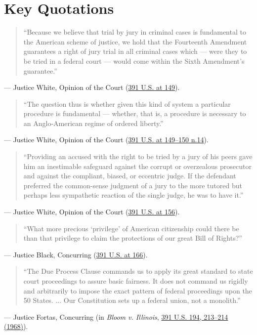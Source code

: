 \documentclass[12pt]{article}
\begin{document}
\section{Key Quotations}

\begin{quote}
``Because we believe that trial by jury in criminal cases is fundamental to the American scheme of justice, we hold that the Fourteenth Amendment guarantees a right of jury trial in all criminal cases which --- were they to be tried in a federal court --- would come within the Sixth Amendment's guarantee.''
\end{quote}
\noindent --- Justice White, Opinion of the Court (\href{https://supreme.justia.com/cases/federal/us/391/145/}{391 U.S. at 149}).

\begin{quote}
``The question thus is whether given this kind of system a particular procedure is fundamental --- whether, that is, a procedure is necessary to an Anglo-American regime of ordered liberty.''
\end{quote}
\noindent --- Justice White, Opinion of the Court (\href{https://supreme.justia.com/cases/federal/us/391/145/}{391 U.S. at 149--150 n.14}).

\begin{quote}
``Providing an accused with the right to be tried by a jury of his peers gave him an inestimable safeguard against the corrupt or overzealous prosecutor and against the compliant, biased, or eccentric judge. If the defendant preferred the common-sense judgment of a jury to the more tutored but perhaps less sympathetic reaction of the single judge, he was to have it.''
\end{quote}
\noindent --- Justice White, Opinion of the Court (\href{https://caselaw.findlaw.com/court/us-supreme-court/391/145.html}{391 U.S. at 156}).

\begin{quote}
``What more precious `privilege' of American citizenship could there be than that privilege to claim the protections of our great Bill of Rights?''
\end{quote}
\noindent --- Justice Black, Concurring (\href{https://supreme.justia.com/cases/federal/us/391/145/}{391 U.S. at 166}).

\begin{quote}
``The Due Process Clause commands us to apply its great standard to state court proceedings to assure basic fairness. It does not command us rigidly and arbitrarily to impose the exact pattern of federal proceedings upon the 50 States. ... Our Constitution sets up a federal union, not a monolith.''
\end{quote}
\noindent --- Justice Fortas, Concurring (in \textit{Bloom v. Illinois}, \href{https://supreme.justia.com/cases/federal/us/391/194/}{391 U.S. 194, 213--214 (1968)}).
\end{document}
